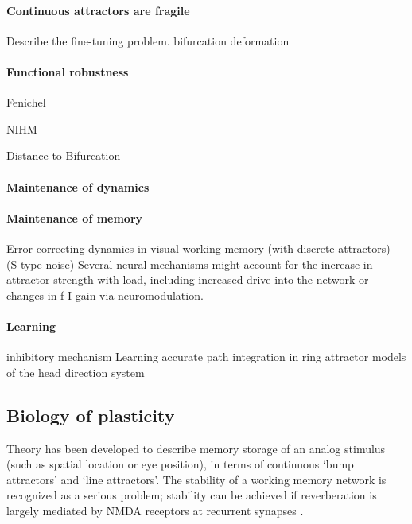 \documentclass{article}
\theoremstyle{definition} \newtheorem{definition}{Definition}
\theoremstyle{remark} \newtheorem{remark}{Remark}
\newcounter{ct}
\begin{document}
\paragraph{Continuous attractors are fragile}
Describe the fine-tuning problem.
bifurcation \citep{dercole2011dynamical}
deformation \citep{goodridge2000modeling}

\paragraph{Functional robustness}

Fenichel

NIHM

\citep{li2013normally}

Distance to Bifurcation \citep{dobson2003sensitivity}


\paragraph{Maintenance of dynamics}


\paragraph{Maintenance of memory}
Error-correcting dynamics in visual working memory (with discrete attractors) \citep{panichello2019error} (S-type noise)
Several neural mechanisms might account for the increase in attractor strength with load, including increased drive into the network\citep{wang2018flexible} or changes in f-I gain via neuromodulation\citep{servan1990network}.





\paragraph{Learning}
inhibitory mechanism \citep{couey2013recurrent}
Learning accurate path integration in ring attractor models of the head direction system \citep{vafidis2022hd}

\subsection{Biology of plasticity}

Theory has been developed to describe memory storage of an analog stimulus (such as spatial location or eye position), in terms of continuous ‘bump attractors' and ‘line attractors'.
The stability of a working memory network is recognized as a serious problem; stability can be achieved if reverberation is largely mediated by NMDA receptors at recurrent synapses \citep{wang2001synaptic}.
\end{document}
